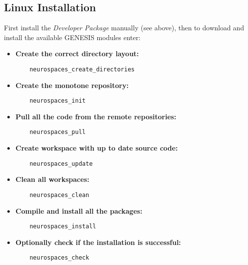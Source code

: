 \documentclass[12pt]{article}
\begin{document}

\subsection*{Linux Installation}

First install the {\it Developer Package} manually (see above), then
to download and install the available GENESIS modules enter:

\begin{itemize}
\item {\bf Create the correct directory layout:}
\begin{verbatim}
	neurospaces_create_directories
\end{verbatim}
  
\item {\bf Create the monotone repository:}
\begin{verbatim}
	neurospaces_init
\end{verbatim}

\item {\bf Pull all the code from the remote repositories:}
\begin{verbatim}
	neurospaces_pull
\end{verbatim}

\item {\bf Create workspace with up to date source code:}
\begin{verbatim}
	neurospaces_update
\end{verbatim}

\item {\bf Clean all workspaces:}
\begin{verbatim}
	neurospaces_clean
\end{verbatim}

\item {\bf Compile and install all the packages:}
\begin{verbatim}
	neurospaces_install
\end{verbatim}

\item {\bf Optionally check if the installation is successful:}
\begin{verbatim}
	neurospaces_check
\end{verbatim}

\end{itemize}
\end{document}
